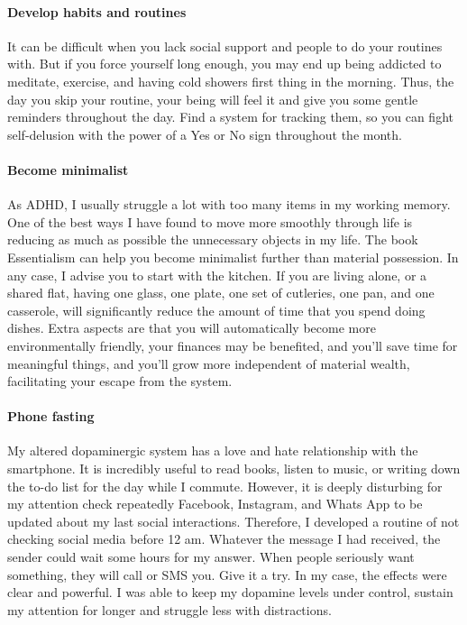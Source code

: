 \documentclass{article}
\begin{document}
\paragraph{Develop habits and routines}
It can be difficult when you lack social support and people to do your routines with. But if you force yourself long enough, you may end up being addicted to meditate, exercise, and having cold showers first thing in the morning. Thus, the day you skip your routine, your being will feel it and give you some gentle reminders throughout the day. Find a system for tracking them, so you can fight self-delusion with the power of a Yes or No sign throughout the month. 
\paragraph{Become minimalist}
As ADHD, I usually struggle a lot with too many items in my working memory. One of the best ways I have found to move more smoothly through life is reducing as much as possible the unnecessary objects in my life. The book Essentialism can help you become minimalist further than material possession. In any case, I advise you to start with the kitchen. If you are living alone, or a shared flat, having one glass, one plate, one set of cutleries, one pan, and one casserole, will significantly reduce the amount of time that you spend doing dishes. Extra aspects are that you will automatically become more environmentally friendly, your finances may be benefited, and you’ll save time for meaningful things, and you’ll grow more independent of material wealth, facilitating your escape from the system. 
\paragraph{Phone fasting}
My altered dopaminergic system has a love and hate relationship with the smartphone. It is incredibly useful to read books, listen to music, or writing down the to-do list for the day while I commute. However, it is deeply disturbing for my attention check repeatedly Facebook, Instagram, and Whats App to be updated about my last social interactions. Therefore, I developed a routine of not checking social media before 12 am. Whatever the message I had received, the sender could wait some hours for my answer. When people seriously want something, they will call or SMS you.  Give it a try. In my case, the effects were clear and powerful. I was able to keep my dopamine levels under control, sustain my attention for longer and struggle less with distractions. 
\end{document}
